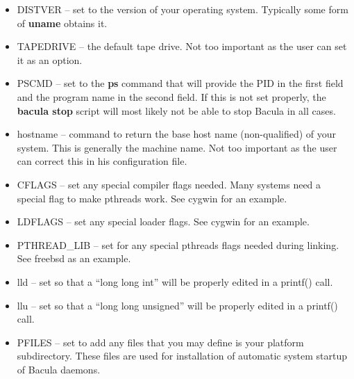 \begin{itemize}
\begin{itemize}
\item DISTVER -- set to the version of your operating system. Typically  some
   form of {\bf uname} obtains it. 
\item TAPEDRIVE -- the default tape drive. Not too important as the user  can
   set it as an option.  
\item PSCMD -- set to the {\bf ps} command that will provide the PID  in the
   first field and the program name in the second field. If this  is not set
   properly, the {\bf bacula stop} script will most likely  not be able to stop
Bacula in all cases.  
\item hostname -- command to return the base host name (non-qualified)  of
   your system. This is generally the machine name. Not too important  as the
   user can correct this in his configuration file. 
\item CFLAGS -- set any special compiler flags needed. Many systems need  a
   special flag to make pthreads work. See cygwin for an example.  
\item LDFLAGS -- set any special loader flags. See cygwin for an example.  
\item PTHREAD\_LIB -- set for any special pthreads flags needed during 
   linking. See freebsd as an example.  
\item lld -- set so that a ``long long int'' will be properly edited in  a
   printf() call.  
\item llu -- set so that a ``long long unsigned'' will be properly edited in 
   a printf() call.  
\item PFILES -- set to add any files that you may define is your platform 
   subdirectory. These files are used for installation of automatic  system
   startup of Bacula daemons.  
\end{itemize}


\end{itemize}
